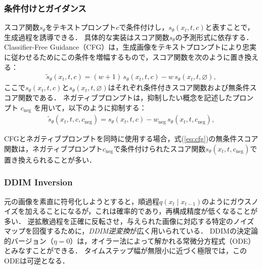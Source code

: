 \documentclass[MIRU,submit]{miru2026j}
\theoremstyle{definition}
\begin{document}
\subsubsection{条件付けとガイダンス}
スコア関数$s_\theta$をテキストプロンプト$c$で条件付けし，$s_\theta({x}_t, t, c)$と表すことで，生成過程を誘導できる\cite{Rombach2022}．
具体的な実装はスコア関数$s_\theta$の予測形式に依存する．
Classifier-Free Guidance（CFG）は，生成画像をテキストプロンプトにより忠実に従わせるためにこの条件を増幅するもので\cite{Ho2021}，スコア関数を次のように置き換える：
\begin{equation}
    \label{eq:cfg}
    \begin{aligned}
        \textstyle \tilde{s}_\theta({x}_t, t, c) = (w+1)\,s_\theta({x}_t, t, c) - w\,s_\theta({x}_t, t, \varnothing),
    \end{aligned}
\end{equation}
ここで$s_\theta({x}_t, t, c)$と$s_\theta({x}_t, t, \varnothing)$はそれぞれ条件付きスコア関数および無条件スコア関数である．
ネガティブプロンプトは，抑制したい概念を記述したプロンプト $c_\text{neg}$ を用いて，以下のように抑制する：
\begin{equation}
    \label{eq:negative_prompt}
    \begin{aligned}
        \textstyle \tilde{s}_\theta({x}_t, t, c, c_\text{neg}) = s_\theta({x}_t, t, c) - w_\text{neg}\,s_\theta({x}_t, t, c_\text{neg}),
    \end{aligned}
\end{equation}

CFGとネガティブプロンプトを同時に使用する場合，式(\ref{eq:cfg})の無条件スコア関数は，ネガティブプロンプト$c_\text{neg}$で条件付けられたスコア関数$s_\theta({x}_t, t, c_\text{neg})$で置き換えられることが多い．

\subsubsection{DDIM Inversion}
元の画像を素直に符号化しようとすると，順過程$q({x_t}\mid{x}_{t-1})$のようにガウスノイズを加えることになるが，これは確率的であり，再構成精度が低くなることが多い．
逆拡散過程を正確に反転させ，与えられた画像に対応する特定のノイズマップを回復するために，\emph{DDIM逆変換}\cite{Mokady2023}が広く用いられている．
DDIMの決定論的バージョン（$\eta=0$）は，オイラー法によって解かれる常微分方程式（ODE）とみなすことができる\cite{Song2021a,Song2021b}．
タイムステップ幅が無限小に近づく極限では，このODEは可逆となる．
\end{document}
